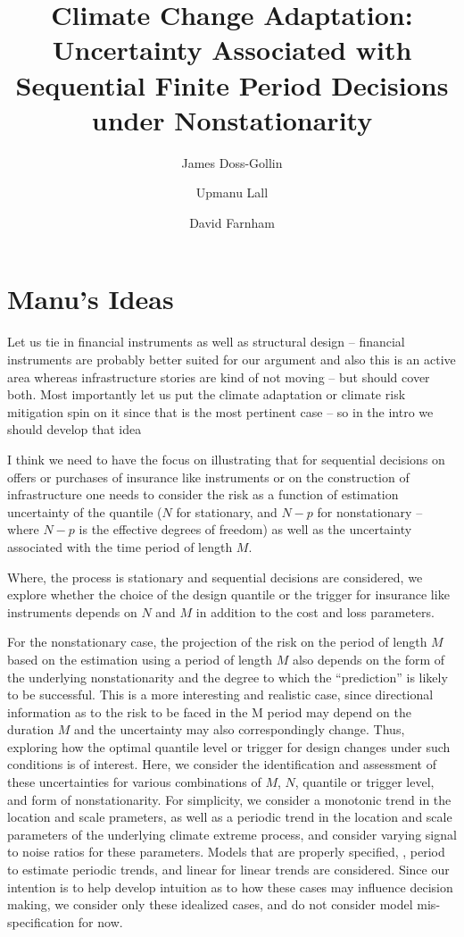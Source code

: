 \documentclass[11pt]{article}
\title{Climate Change Adaptation: Uncertainty Associated with Sequential Finite Period Decisions under Nonstationarity}
\author[1,2]{James Doss-Gollin}
\author[1,2]{Upmanu Lall}
\author[1,2]{David Farnham}
\affil[1]{Columbia Water Center, Columbia University}
\affil[2]{Department of Earth and Environmental Engineering, Columbia University}
\begin{document}
\RaggedRight
\section{Manu's Ideas}

Let us tie in financial instruments as well as structural design -- financial instruments are probably better suited for our argument and also this is an active area whereas infrastructure stories are kind of not moving  -- but should cover both. Most importantly let us put the climate adaptation or climate risk mitigation spin on it since that is the most pertinent case -- so in the intro we should develop that idea

I think we need to have the focus on illustrating that for sequential decisions on offers or purchases of insurance like instruments or on the construction of infrastructure one needs to consider the risk as a function of estimation uncertainty of the quantile ($N$ for stationary, and $N-p$ for nonstationary -- where $N-p$ is the effective degrees of freedom) as well as the uncertainty associated with the time period of length $M$.

Where, the process is stationary and sequential decisions are considered, we explore whether the choice of the design quantile or the trigger for insurance like instruments depends on $N$ and $M$ in addition to the cost and loss parameters.

For the nonstationary case, the projection of the risk on the period of length $M$ based on the estimation using a period of length $M$ also depends on the form of the underlying nonstationarity and the degree to which the ``prediction'' is likely to be successful.
This is a more interesting and realistic case, since directional information as to the risk to be faced in the M period may depend on the duration $M$ and the uncertainty may also correspondingly change.
Thus, exploring how the optimal quantile level or trigger for design changes under such conditions is of interest.
Here, we consider the identification and assessment of these uncertainties for various combinations of $M$, $N$, quantile or trigger level, and form of nonstationarity.
For simplicity, we consider a monotonic trend in the location and scale prameters, as well as a periodic trend in the location and scale parameters of the underlying climate extreme process, and consider varying signal to noise ratios for these parameters.
Models that are properly specified, \ie, period to estimate periodic trends, and linear for linear trends are considered.
Since our intention is to help develop intuition as to how these cases may influence decision making, we consider only these idealized cases, and do not consider model mis-specification for now.
\end{document}
